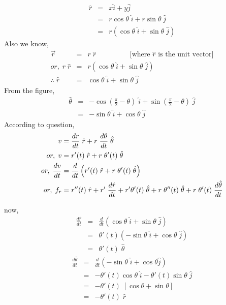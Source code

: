 \documentclass{article}
\begin{document}
\large{
    \begin{eqnarray*}
        \hat{r} &=& x\hat{i} + y\hat{j}\\
                &=& r\cos{\theta}\;\hat{i} + r\sin{\theta}\;\hat{j}\\
                &=& r(\cos{\theta}\;\hat{i} + \sin{\theta}\;\hat{j})
    \end{eqnarray*}
    Also we know,
    \begin{eqnarray*}
        \vec{r} &=& r\;\hat{r}\hspace{2cm}\text{[where $\hat{r}$ is the unit vector]}\\
        or,\; r\;\hat{r} &=& r(\cos{\theta}\;\hat{i} + \sin{\theta}\;\hat{j})\\
        \therefore\;\hat{r} &=& \cos{\theta}\;\hat{i} + \sin{\theta}\;\hat{j}
    \end{eqnarray*}
    From the figure,
    \begin{eqnarray*}
        \hat{\theta} &=& -\cos{\left(\frac{\pi}{2} - \theta\right)}\;\hat{i} + \sin{\left(\frac{\pi}{2} - \theta\right)}\;\hat{j}\\
                     &=& -\sin{\theta}\;\hat{i} + \cos{\theta}\;\hat{j}
    \end{eqnarray*}
    According to question,
    \begin{align}
        v &= \frac{dr}{dt}\;\hat{r} + r\;\frac{d\theta}{dt}\;\hat{\theta}\notag\\
        or,\; v&= r'(t)\;\hat{r} + r\;\theta'(t)\;\hat{\theta}\notag\\
        or,\; \frac{dv}{dt} &= \frac{d}{dt}\left(r'(t)\;\hat{r} + r\;\theta'(t)\;\hat{\theta}\right)\notag\\
        or,\; f_r &= r''(t)\;\hat{r} + r'\;\frac{d\hat{r}}{dt} + r'\theta'(t)\;\hat{\theta} + r\;\theta''(t)\;\hat{\theta}+r\;\theta'(t) \;\frac{d\hat{\theta}}{dt}
    \end{align}

    now,
    \begin{eqnarray*}
        \frac{d\hat{r}}{dt} &=& \frac{d}{dt}\left(\cos{\theta}\;\hat{i} + \sin{\theta}\;\hat{j}\right)\\
                            &=& \theta'(t)\left(-\sin{\theta}\;\hat{i} + \cos{\theta}\;\hat{j}\right)\\
                            &=& \theta'(t)\;\hat{\theta}
    \end{eqnarray*}
    \begin{eqnarray*}
        \frac{d\hat{\theta}}{dt} &=& \frac{d}{dt}\left(-\sin{\theta}\;\hat{i} + \cos{\theta}\hat{j}\right)\\
                                 &=& -\theta'(t)\cos{\theta}\;\hat{i} - \theta'(t)\sin{\theta}\;\hat{j}\\
                                 &=& -\theta'(t)\;[\cos{\theta} + \sin{\theta}]\\
                                 &=& -\theta'(t)\;\hat{r}\\
    \end{eqnarray*}

}
\end{document}
